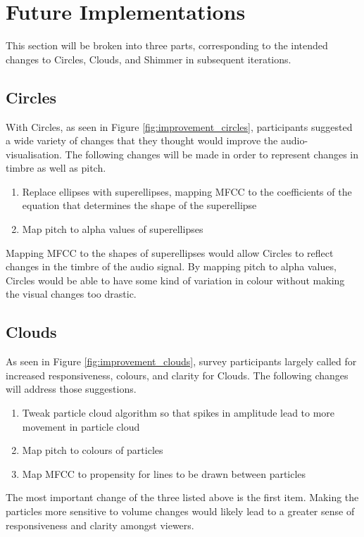\documentclass[../initial_thesis.tex]{subfiles}
\begin{document}
\section{Future Implementations}
This section will be broken into three parts, corresponding to the intended changes to Circles, Clouds, and Shimmer in subsequent iterations.

\subsection{Circles}
With Circles, as seen in Figure \ref{fig:improvement_circles}, participants suggested a wide variety of changes that they thought would improve the audio-visualisation. The following changes will be made in order to represent changes in timbre as well as pitch.
\begin{enumerate}
\item {Replace ellipses with superellipses, mapping MFCC to the coefficients of the equation that determines the shape of the superellipse}
\item {Map pitch to alpha values of superellipses}
\end{enumerate}
Mapping MFCC to the shapes of superellipses would allow Circles to reflect changes in the timbre of the audio signal. By mapping pitch to alpha values, Circles would be able to have some kind of variation in colour without making the visual changes too drastic.

\subsection{Clouds}
As seen in Figure \ref{fig:improvement_clouds}, survey participants largely called for increased responsiveness, colours, and clarity for Clouds. The following changes will address those suggestions.
\begin{enumerate}
\item {Tweak particle cloud algorithm so that spikes in amplitude lead to more movement in particle cloud}
\item {Map pitch to colours of particles}
\item {Map MFCC to propensity for lines to be drawn between particles}
\end{enumerate}
The most important change of the three listed above is the first item. Making the particles more sensitive to volume changes would likely lead to a greater sense of responsiveness and clarity amongst viewers.
\end{document}

